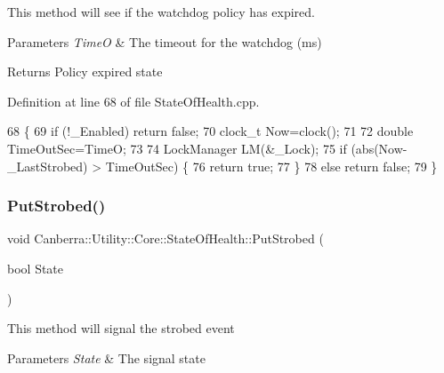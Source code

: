 This method will see if the watchdog policy has expired. 


\begin{DoxyParams}{Parameters}
{\em TimeO} & The timeout for the watchdog (ms)\\
\hline
\end{DoxyParams}
\begin{DoxyReturn}{Returns}
Policy expired state
\end{DoxyReturn}


Definition at line 68 of file State\+Of\+Health.\+cpp.


\begin{DoxyCode}
68                                                                \{
69     \textcolor{keywordflow}{if} (!\_Enabled) \textcolor{keywordflow}{return} \textcolor{keyword}{false};
70     clock\_t Now=clock();
71 
72     \textcolor{keywordtype}{double} TimeOutSec=TimeO;
73 
74     LockManager LM(&\_Lock);
75     \textcolor{keywordflow}{if} (abs(Now-\_LastStrobed) > TimeOutSec) \{
76         \textcolor{keywordflow}{return} \textcolor{keyword}{true};
77     \}
78     \textcolor{keywordflow}{else} \textcolor{keywordflow}{return} \textcolor{keyword}{false};
79 \}
\end{DoxyCode}
\mbox{\label{class_canberra_1_1_utility_1_1_core_1_1_state_of_health_a9c16550a6f35cbf8d96bb4e1c88c15cd_a9c16550a6f35cbf8d96bb4e1c88c15cd}} 
\subsubsection{\texorpdfstring{Put\+Strobed()}{PutStrobed()}}
{\footnotesize\ttfamily void Canberra\+::\+Utility\+::\+Core\+::\+State\+Of\+Health\+::\+Put\+Strobed (\begin{DoxyParamCaption}\item[{bool}]{State }\end{DoxyParamCaption})}



This method will signal the strobed event 


\begin{DoxyParams}{Parameters}
{\em State} & The signal state\\
\hline
\end{DoxyParams}


